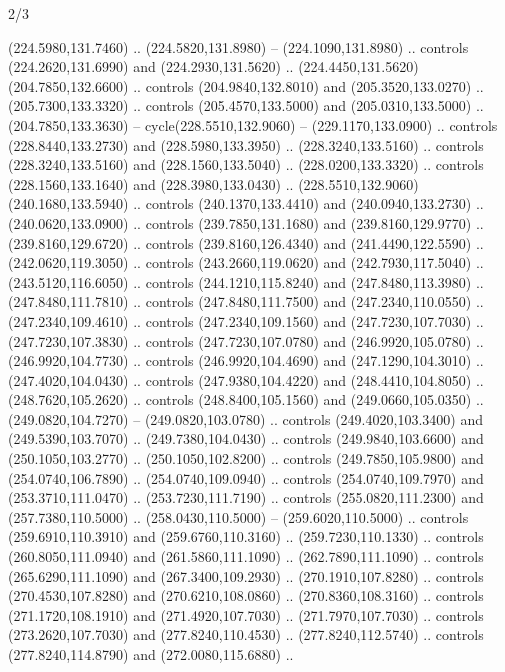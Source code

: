 \begin{flagdescription}{2/3}
\begin{scope}[xshift=0.5\flaglength,yshift=0.5\flagwidth,scale=\flagwidth/259.2]
\begin{scope}[y=0.8pt, x=0.8pt, yscale=-1,shift={(-243,-162)}]
      (224.5980,131.7460) .. (224.5820,131.8980) -- (224.1090,131.8980) .. controls
      (224.2620,131.6990) and (224.2930,131.5620) ..
      (224.4450,131.5620)(204.7850,132.6600) .. controls (204.9840,132.8010) and
      (205.3520,133.0270) .. (205.7300,133.3320) .. controls (205.4570,133.5000) and
      (205.0310,133.5000) .. (204.7850,133.3630) -- cycle(228.5510,132.9060) --
      (229.1170,133.0900) .. controls (228.8440,133.2730) and (228.5980,133.3950) ..
      (228.3240,133.5160) .. controls (228.3240,133.5160) and (228.1560,133.5040) ..
      (228.0200,133.3320) .. controls (228.1560,133.1640) and (228.3980,133.0430) ..
      (228.5510,132.9060)(240.1680,133.5940) .. controls (240.1370,133.4410) and
      (240.0940,133.2730) .. (240.0620,133.0900) .. controls (239.7850,131.1680) and
      (239.8160,129.9770) .. (239.8160,129.6720) .. controls (239.8160,126.4340) and
      (241.4490,122.5590) .. (242.0620,119.3050) .. controls (243.2660,119.0620) and
      (242.7930,117.5040) .. (243.5120,116.6050) .. controls (244.1210,115.8240) and
      (247.8480,113.3980) .. (247.8480,111.7810) .. controls (247.8480,111.7500) and
      (247.2340,110.0550) .. (247.2340,109.4610) .. controls (247.2340,109.1560) and
      (247.7230,107.7030) .. (247.7230,107.3830) .. controls (247.7230,107.0780) and
      (246.9920,105.0780) .. (246.9920,104.7730) .. controls (246.9920,104.4690) and
      (247.1290,104.3010) .. (247.4020,104.0430) .. controls (247.9380,104.4220) and
      (248.4410,104.8050) .. (248.7620,105.2620) .. controls (248.8400,105.1560) and
      (249.0660,105.0350) .. (249.0820,104.7270) -- (249.0820,103.0780) .. controls
      (249.4020,103.3400) and (249.5390,103.7070) .. (249.7380,104.0430) .. controls
      (249.9840,103.6600) and (250.1050,103.2770) .. (250.1050,102.8200) .. controls
      (249.7850,105.9800) and (254.0740,106.7890) .. (254.0740,109.0940) .. controls
      (254.0740,109.7970) and (253.3710,111.0470) .. (253.7230,111.7190) .. controls
      (255.0820,111.2300) and (257.7380,110.5000) .. (258.0430,110.5000) --
      (259.6020,110.5000) .. controls (259.6910,110.3910) and (259.6760,110.3160) ..
      (259.7230,110.1330) .. controls (260.8050,111.0940) and (261.5860,111.1090) ..
      (262.7890,111.1090) .. controls (265.6290,111.1090) and (267.3400,109.2930) ..
      (270.1910,107.8280) .. controls (270.4530,107.8280) and (270.6210,108.0860) ..
      (270.8360,108.3160) .. controls (271.1720,108.1910) and (271.4920,107.7030) ..
      (271.7970,107.7030) .. controls (273.2620,107.7030) and (277.8240,110.4530) ..
      (277.8240,112.5740) .. controls (277.8240,114.8790) and (272.0080,115.6880) ..

\end{scope}
\end{scope}
\end{flagdescription}
